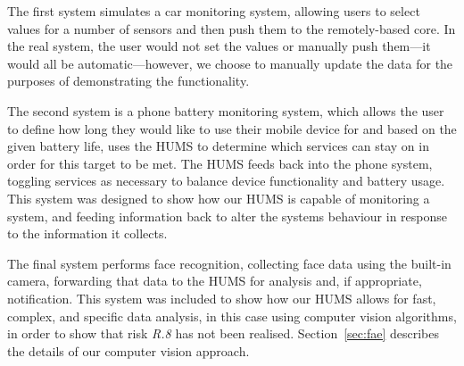 \documentclass[10pt,a4paper]{article}
\begin{document}
The first system simulates a car monitoring system, allowing users to select values for a number of sensors and then push them to the remotely-based core. In the real system, the user would not set the values or manually push them---it would all be automatic---however, we choose to manually update the data for the purposes of demonstrating the functionality.

The second system is a phone battery monitoring system, which allows the user to define how long they would like to use their mobile device for and based on the given battery life, uses the HUMS to determine which services can stay on in order for this target to be met. The HUMS feeds back into the phone system, toggling services as necessary to balance device functionality and battery usage. This system was designed to show how our HUMS is capable of monitoring a system, and feeding information back to alter the systems behaviour in response to the information it collects.

The final system performs face recognition, collecting face data using the built-in camera, forwarding that data to the HUMS for analysis and, if appropriate, notification. This system was included to show how our HUMS allows for fast, complex, and specific data analysis, in this case using computer vision algorithms, in order to show that risk \emph{R.8} has not been realised. Section~\ref{sec:fae} describes the details of our computer vision approach.
\end{document}
